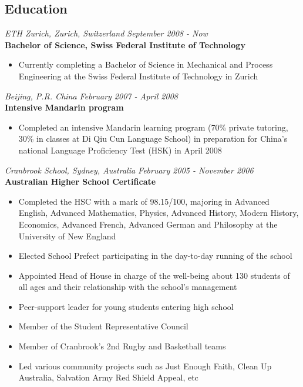 \documentclass[margin]{res}
\begin{document}
\begin{resume}
\section{Education}
  {\it ETH Zurich, Zurich, Switzerland \hfill September 2008 - Now} \\
  {\bf Bachelor of Science, Swiss Federal Institute of Technology}
  \begin{itemize} \itemsep -0.5pt  %
  \item Currently completing a Bachelor of Science in Mechanical and Process Engineering at the Swiss Federal Institute of Technology in Zurich
  \end{itemize}
  {\it Beijing, P.R. China \hfill February 2007 - April 2008} \\
  {\bf Intensive Mandarin program}
  \begin{itemize} \itemsep -0.5pt  %
  \item Completed an intensive Mandarin learning program (70\% private tutoring, 30\% in classes at Di Qiu Cun Language School) in preparation for China’s national Language Proficiency Test (HSK) in April 2008
  \end{itemize}
  {\it Cranbrook School, Sydney, Australia \hfill February 2005 - November 2006} \\
  {\bf Australian Higher School Certificate}
  \begin{itemize} \itemsep -0.5pt  %
  \item Completed the HSC with a mark of 98.15/100, majoring in Advanced English, Advanced Mathematics, Physics, Advanced History, Modern History, Economics, Advanced French, Advanced German and Philosophy at the University of New England
  \item Elected School Prefect participating in the day-to-day running of the school
  \item Appointed Head of House in charge of the well-being about 130 students of all ages 
and their relationship with the school’s management
  \item Peer-support leader for young students entering high school
  \item Member of the Student Representative Council
  \item Member of Cranbrook’s 2nd Rugby and Basketball teams
  \item Led various community projects such as Just Enough Faith, Clean Up Australia, Salvation Army Red Shield Appeal, etc

\end{itemize}
\end{resume}
\end{document}
